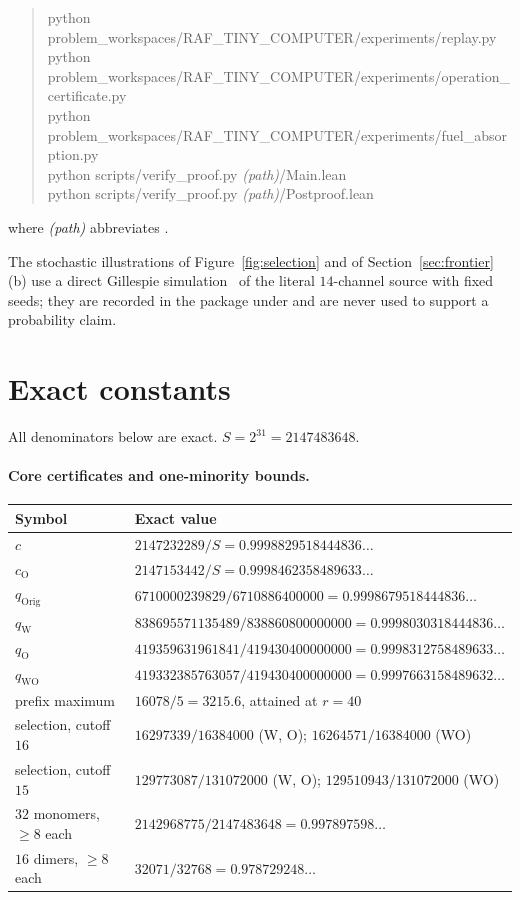 \documentclass[11pt,a4paper]{article}
\theoremstyle{plain}
\theoremstyle{definition}
\theoremstyle{remark}
\begin{document}
\begin{quote}\footnotesize\ttfamily
python problem\_workspaces/RAF\_TINY\_COMPUTER/experiments/replay.py\\
python problem\_workspaces/RAF\_TINY\_COMPUTER/experiments/operation\_certificate.py\\
python problem\_workspaces/RAF\_TINY\_COMPUTER/experiments/fuel\_absorption.py\\
python scripts/verify\_proof.py \textrm{\itshape(path)}/Main.lean\\
python scripts/verify\_proof.py \textrm{\itshape(path)}/Postproof.lean
\end{quote}
\noindent where \textrm{\itshape(path)} abbreviates
.

The stochastic illustrations of Figure~\ref{fig:selection} and of
Section~\ref{sec:frontier}(b) use a direct Gillespie simulation~\citep{gillespie1977} of
the literal $14$-channel source with fixed seeds; they are recorded in the package under
 and are never used to support a probability claim.

\section{Exact constants}\label{app:exact}

All denominators below are exact. $S=2^{31}=2147483648$.

\paragraph{Core certificates and one-minority bounds.}
\begin{center}\small
\begin{tabular}{@{}ll@{}}\toprule
Symbol & Exact value\\\midrule
$c$ & $2147232289/S=0.9998829518444836\ldots$\\
$c_{\mathrm O}$ & $2147153442/S=0.9998462358489633\ldots$\\
$q_{\mathrm{Orig}}$ & $6710000239829/6710886400000=0.9998679518444836\ldots$\\
$q_{\mathrm W}$ & $838695571135489/838860800000000=0.9998030318444836\ldots$\\
$q_{\mathrm O}$ & $419359631961841/419430400000000=0.9998312758489633\ldots$\\
$q_{\mathrm{WO}}$ & $419332385763057/419430400000000=0.9997663158489632\ldots$\\
prefix maximum & $16078/5=3215.6$, attained at $r=40$\\
selection, cutoff $16$ & $16297339/16384000$ (W, O); $16264571/16384000$ (WO)\\
selection, cutoff $15$ & $129773087/131072000$ (W, O); $129510943/131072000$ (WO)\\
$32$ monomers, $\ge8$ each & $2142968775/2147483648=0.997897598\ldots$\\
$16$ dimers, $\ge8$ each & $32071/32768=0.978729248\ldots$\\\bottomrule
\end{tabular}
\end{center}
\end{document}
